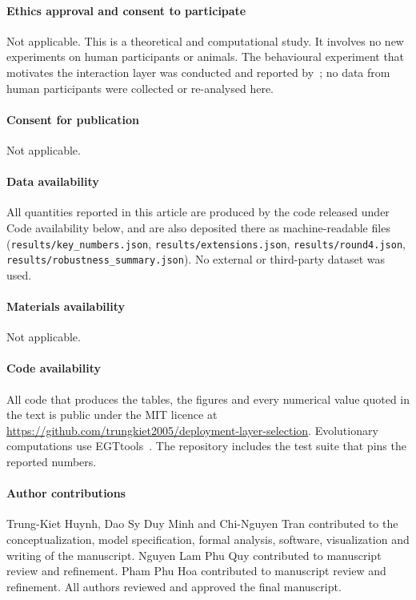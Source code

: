 \documentclass[pdflatex]{sn-jnl}
\theoremstyle{thmstyleone}
\theoremstyle{thmstylethree}
\theoremstyle{thmstyletwo}
\begin{document}
\paragraph{Ethics approval and consent to participate}
Not applicable. This is a theoretical and computational study. It involves no
new experiments on human participants or animals. The behavioural experiment
that motivates the interaction layer was conducted and reported
by~\citet{domingos2026falling}; no data from human participants were collected
or re-analysed here.

\paragraph{Consent for publication}
Not applicable.

\paragraph{Data availability}
All quantities reported in this article are produced by the code released under
Code availability below, and are also deposited there as machine-readable files
(\texttt{results/key\_numbers.json}, \texttt{results/extensions.json},
\texttt{results/round4.json}, \texttt{results/robustness\_summary.json}).
No external or third-party dataset was used.

\paragraph{Materials availability}
Not applicable.

\paragraph{Code availability}
All code that produces the tables, the figures and every numerical value quoted
in the text is public under the MIT licence at
\sloppy\url{https://github.com/trungkiet2005/deployment-layer-selection}.
Evolutionary computations use EGTtools~\citep{domingos2023egttools}. The
repository includes the test suite that pins the reported numbers.

\paragraph{Author contributions}
Trung-Kiet Huynh, Dao Sy Duy Minh and Chi-Nguyen Tran contributed to the
conceptualization, model specification, formal analysis, software,
visualization and writing of the manuscript. Nguyen Lam Phu Quy contributed to
manuscript review and refinement. Pham Phu Hoa contributed to manuscript
review and refinement. All authors reviewed and approved the final manuscript.
\end{document}

